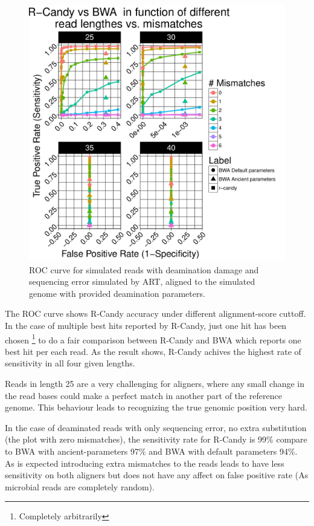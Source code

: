 \documentclass[11pt,a4paper]{report}
\begin{document}
\begin{figure}[H]
\centering
\includegraphics[width=12cm]{pictures/bROC_DS1_ART.pdf}
\caption{ROC curve for simulated reads with deamination damage and sequencing 
error simulated by ART, aligned to the simulated genome with provided 
deamination parameters.}
\label{DS1}
\end{figure}


The ROC curve shows R-Candy accuracy under different alignment-score cuttoff.
In the case of multiple best hits reported by R-Candy, just one hit has been 
chosen \footnote{Completely arbitrarily} to do a fair comparison 
between R-Candy and BWA which reports one best hit per each read.
As the result shows, R-Candy achives the highest rate of sensitivity
in all four given lengths.

Reads in length 25 are a very challenging for aligners, where any small change 
in the read bases could make a perfect match in another part of the reference 
genome. This behaviour leads to recognizing the true genomic position very hard. 

In the case of deaminated reads with only sequencing error, no extra substitution 
(the plot with zero mismatches), the sensitivity rate for R-Candy is 99\% compare 
to BWA with ancient-parameters 97\% and BWA with default parameters 94\%. 
As is expected introducing extra mismatches to the reads leads to have less 
sensitivity on both aligners but does not have any affect on false positive rate
(As microbial reads are completely random).
\end{document}
